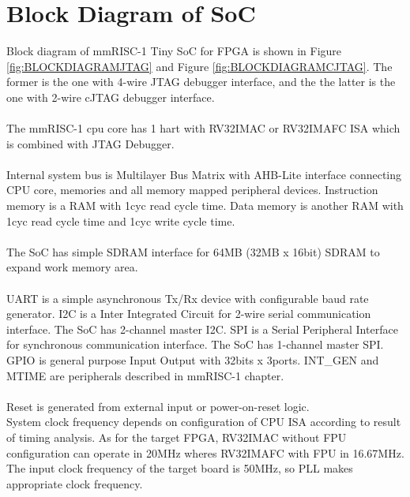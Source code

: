 \section{Block Diagram of SoC}

Block diagram of mmRISC-1 Tiny SoC for FPGA is shown in Figure \ref{fig:BLOCKDIAGRAMJTAG} and Figure \ref{fig:BLOCKDIAGRAMCJTAG}. The former is the one with 4-wire JTAG debugger interface, and the the latter is the one with 2-wire cJTAG debugger interface.\\\\

The mmRISC-1 cpu core has 1 hart with RV32IMAC or RV32IMAFC ISA which is combined with JTAG Debugger. \\\\
Internal system bus is Multilayer Bus Matrix with AHB-Lite interface connecting CPU core, memories and all memory mapped peripheral devices. Instruction memory is a RAM with 1cyc read cycle time. Data memory is another RAM with 1cyc read cycle time and 1cyc write cycle time. \\\\
The SoC has simple SDRAM interface for 64MB (32MB x 16bit) SDRAM to expand work memory area.\\\\

UART is a simple asynchronous Tx/Rx device with configurable baud rate generator. 
I2C is a Inter Integrated Circuit for 2-wire serial communication interface. The SoC has 2-channel master I2C.
SPI is a Serial Peripheral Interface for synchronous communication interface. The SoC has 1-channel master SPI.
GPIO is general purpose Input Output with 32bits x 3ports. 
INT\_GEN and MTIME are peripherals described in mmRISC-1 chapter.\\\\

Reset is generated from external input or power-on-reset logic.\\
System clock frequency depends on configuration of CPU ISA according to result of timing analysis. As for the target FPGA, RV32IMAC without FPU configuration can operate in 20MHz wheres RV32IMAFC with FPU in 16.67MHz. The input clock frequency of the target board is 50MHz, so PLL makes appropriate clock frequency. \\\\

